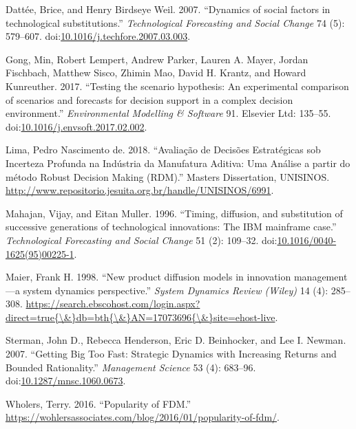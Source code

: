\documentclass[12pt,ignorenonframetext,]{beamer}
\begin{document}
\hypertarget{ref-Dattee2007}{}
Dattée, Brice, and Henry Birdseye Weil. 2007. ``Dynamics of social
factors in technological substitutions.'' \emph{Technological
Forecasting and Social Change} 74 (5): 579--607.
doi:\href{https://doi.org/10.1016/j.techfore.2007.03.003}{10.1016/j.techfore.2007.03.003}.

\hypertarget{ref-Gong2017}{}
Gong, Min, Robert Lempert, Andrew Parker, Lauren A. Mayer, Jordan
Fischbach, Matthew Sisco, Zhimin Mao, David H. Krantz, and Howard
Kunreuther. 2017. ``Testing the scenario hypothesis: An experimental
comparison of scenarios and forecasts for decision support in a complex
decision environment.'' \emph{Environmental Modelling \& Software} 91.
Elsevier Ltd: 135--55.
doi:\href{https://doi.org/10.1016/j.envsoft.2017.02.002}{10.1016/j.envsoft.2017.02.002}.

\hypertarget{ref-Lima2018}{}
Lima, Pedro Nascimento de. 2018. ``Avaliação de Decisões Estratégicas
sob Incerteza Profunda na Indústria da Manufatura Aditiva: Uma Análise a
partir do método Robust Decision Making (RDM).'' Masters Dissertation,
UNISINOS.
\url{http://www.repositorio.jesuita.org.br/handle/UNISINOS/6991}.

\hypertarget{ref-Mahajan1996}{}
Mahajan, Vijay, and Eitan Muller. 1996. ``Timing, diffusion, and
substitution of successive generations of technological innovations: The
IBM mainframe case.'' \emph{Technological Forecasting and Social Change}
51 (2): 109--32.
doi:\href{https://doi.org/10.1016/0040-1625(95)00225-1}{10.1016/0040-1625(95)00225-1}.

\hypertarget{ref-Maier1998}{}
Maier, Frank H. 1998. ``New product diffusion models in innovation
management---a system dynamics perspective.'' \emph{System Dynamics
Review (Wiley)} 14 (4): 285--308.
\href{https://search.ebscohost.com/login.aspx?direct=true\%7B/\&\%7Ddb=bth\%7B/\&\%7DAN=17073696\%7B/\&\%7Dsite=ehost-live}{https://search.ebscohost.com/login.aspx?direct=true\{\textbackslash{}\&\}db=bth\{\textbackslash{}\&\}AN=17073696\{\textbackslash{}\&\}site=ehost-live}.

\hypertarget{ref-Sterman2007}{}
Sterman, John D., Rebecca Henderson, Eric D. Beinhocker, and Lee I.
Newman. 2007. ``Getting Big Too Fast: Strategic Dynamics with Increasing
Returns and Bounded Rationality.'' \emph{Management Science} 53 (4):
683--96.
doi:\href{https://doi.org/10.1287/mnsc.1060.0673}{10.1287/mnsc.1060.0673}.

\hypertarget{ref-Wholers2016}{}
Wholers, Terry. 2016. ``Popularity of FDM.''
\url{https://wohlersassociates.com/blog/2016/01/popularity-of-fdm/}.
\end{document}
